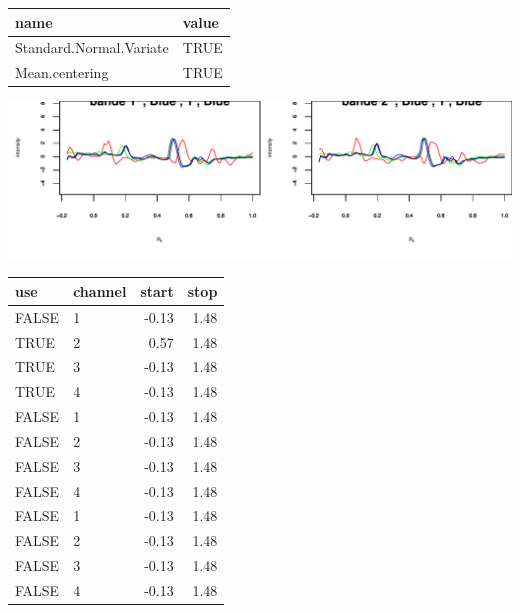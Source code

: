 \documentclass[a4paper]{article}\usepackage[]{graphicx}\usepackage[]{color}
\makeatletter
\def\maxwidth{ %
  \ifdim\Gin@nat@width>\linewidth
    \linewidth
  \else
    \Gin@nat@width
  \fi
}
\makeatother
\begin{document}
\begin{table}[ht]
\centering
\begin{tabular}{ll}
  \hline
name & value \\ 
  \hline
Standard.Normal.Variate & TRUE \\ 
  Mean.centering & TRUE \\ 
   \hline
\end{tabular}
\end{table}



\includegraphics[width=\maxwidth]{figure/unnamed-chunk-5-1} 





\begin{table}[ht]
\centering
\begin{tabular}{llrr}
  \hline
use & channel & start & stop \\ 
  \hline
FALSE & 1 & -0.13 & 1.48 \\ 
  TRUE & 2 & 0.57 & 1.48 \\ 
  TRUE & 3 & -0.13 & 1.48 \\ 
  TRUE & 4 & -0.13 & 1.48 \\ 
  FALSE & 1 & -0.13 & 1.48 \\ 
  FALSE & 2 & -0.13 & 1.48 \\ 
  FALSE & 3 & -0.13 & 1.48 \\ 
  FALSE & 4 & -0.13 & 1.48 \\ 
  FALSE & 1 & -0.13 & 1.48 \\ 
  FALSE & 2 & -0.13 & 1.48 \\ 
  FALSE & 3 & -0.13 & 1.48 \\ 
  FALSE & 4 & -0.13 & 1.48 \\ 
   \hline
\end{tabular}
\end{table}
\end{document}
